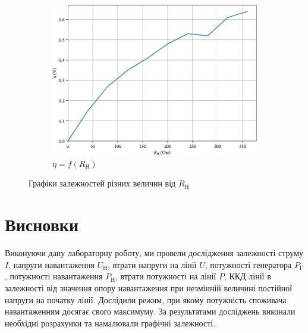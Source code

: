 \documentclass[a4paper,oneside,DIV=10,12pt]{scrartcl}
\begin{document}
		\begin{figure}
		\centering
		\ContinuedFloat
			\begin{subfigure}{\textwidth}
				\includegraphics[width=\textwidth]{07-eta-edited.pdf}
				\caption{$\eta = f(R_{\text{Н}})$}
			\end{subfigure}
		\caption{Графіки залежностей різних величин від $R_{\text{Н}}$}
		\label{fig:plots}
		\end{figure}
		
	\section{Висновки}
		Виконуючи дану лабораторну роботу, ми провели дослідження залежності струму $I$, напруги навантаження $U_{\text{Н}}$, втрати напруги на лінії $U$, потужності генератора $P_{\text{Г}}$, потужності навантаження $P_{\text{Н}}$, втрати потужності на лінії $P$, ККД лінії в залежності від значення опору навантаження при незмінній величині постійної напруги на початку лінії. Дослідили режим, при якому потужність споживача навантаженням досягає свого максимуму. За результатами досліджень виконали необхідні розрахунки та намалювали графічні залежності.
\end{document}
